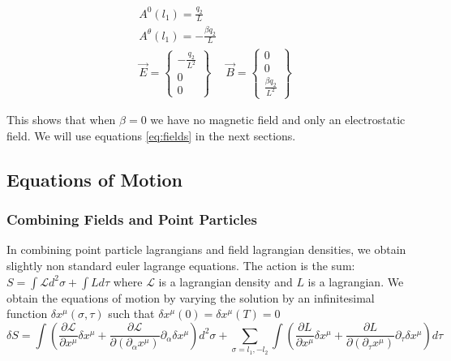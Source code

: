 \documentclass[11pt,a4paper]{article}
\begin{document}
\begin{subequations}
\label{eq:fieldsNonrelativistic}
\begin{align}
&A^{0}\left(l_{1}\right)=\frac{q_2}{L}\\
&A^{\theta}\left(l_{1}\right)=-\frac{\beta q_2}{L}\\
&\vec{E}=\left\{ \begin{array}{c}
-\frac{q_2}{L^2}\\
0\\
0
\end{array}\right\}
&\vec{B}=\left\{ \begin{array}{c}
0\\
0\\
\frac{\beta q_2}{L^2}
\end{array}\right\}
\end{align}
\end{subequations}

This shows that when $\beta=0$ we have no magnetic field and only an electrostatic field. We will use equations \ref{eq:fields} in the next sections.
 
\FloatBarrier
\subsection{Equations of Motion}
\label{sec:eom}

\FloatBarrier
\subsubsection{Combining Fields and Point Particles}

In combining point particle lagrangians and field lagrangian densities, we obtain slightly non standard euler lagrange equations. The action is the sum: $S=\int\mathcal{L}d^{2}\sigma+\int Ld\tau$ where $\mathcal{L}$ is a lagrangian density and $L$ is a lagrangian. We obtain the equations of motion by varying the solution by an infinitesimal function $\delta x^{\mu}(\sigma,\tau)$ such that $\delta x^{\mu}(0)=\delta x^{\mu}(T)=0$
\begin{equation*}
\delta S=\int\left(\frac{\partial\mathcal{L}}{\partial x^{\mu}}\delta x^{\mu}+\frac{\partial\mathcal{L}}{\partial(\partial_{\alpha}x^{\mu})}\partial_{\alpha}\delta x^{\mu}\right)d^{2}\sigma+\sum_{\sigma=l_1,-l_2} \int\left(\frac{\partial L}{\partial x^{\mu}}\delta x^{\mu}+\frac{\partial L}{\partial(\partial_{\tau}x^{\mu})}\partial_{\tau}\delta x^{\mu}\right)d\tau
\end{equation*}
\end{document}
